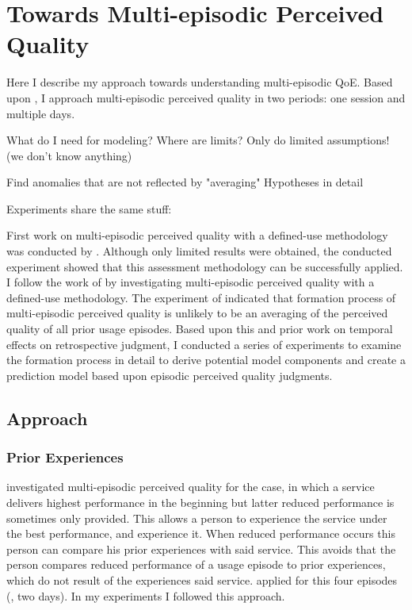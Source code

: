 \chapter{Towards Multi-episodic Perceived Quality}\label{chap:towards}

\begin{chapter-abstract}
Here I describe my approach towards understanding multi-episodic QoE.
Based upon \cite{moller_single-call_2011}, I approach multi-episodic perceived quality in two periods: one session and multiple days.

What do I need for modeling?
Where are limits?
Only do limited assumptions! (we don't know anything)

Find anomalies that are not reflected by "averaging"
Hypotheses in detail

Experiments share the same stuff:
\end{chapter-abstract}

First work on multi-episodic perceived quality with a defined-use methodology was conducted by \cite{moller_single-call_2011}.
Although only limited results were obtained, the conducted experiment showed that this assessment methodology can be successfully applied.
I follow the work of \cite{moller_single-call_2011} by investigating multi-episodic perceived quality with a defined-use methodology.
The experiment of \cite{moller_single-call_2011} indicated that formation process of multi-episodic perceived quality is unlikely to be an averaging of the perceived quality of all prior usage episodes.
Based upon this and prior work on temporal effects on retrospective judgment, I conducted a series of experiments to examine the formation process in detail to derive potential model components and create a prediction model based upon episodic perceived quality judgments.

\section{Approach}
\subsection{Prior Experiences}
\cite{moller_single-call_2011} investigated multi-episodic perceived quality for the case, in which a service delivers highest performance in the beginning but latter reduced performance is sometimes only provided.
This allows a person to experience the service under the best performance, and experience it.
When reduced performance occurs this person can compare his prior experiences with said service.
This avoids that the person compares reduced performance of a usage episode to prior experiences, which do not result of the experiences said service.
\cite{moller_single-call_2011} applied for this four episodes (\ie, two days).
In my experiments I followed this approach.


